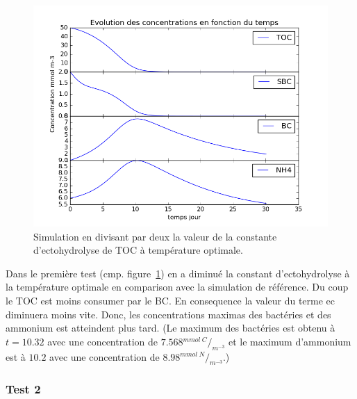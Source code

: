 \begin{figure}[h!]
  \includegraphics[width=\textwidth]{partie1/Test1.png}
  \caption{Simulation en divisant par deux la valeur de la constante d'ectohydrolyse de TOC \`a temp\'erature optimale.
  }
  \label{fig:partie1test1}
\end{figure}
\par{
Dans le première test (cmp. figure~\ref{fig:partie1test1}) en a diminué la constant d'ectohydrolyse à la température optimale en comparison avec
la simulation de référence. Du coup le TOC est moins consumer par le BC. En consequence la valeur du terme
ec diminuera moins vite. Donc, les concentrations maximas des bactéries et des ammonium est atteindent
plus tard. (Le maximum des bactéries est obtenu à $t=10.32$ avec une concentration de
$7.568 {^{mmol~C}/_{m^{-3}}}$ et le maximum d'ammonium est à $10.2$ avec une concentration de
$8.98 {^{mmol~N}/_{m^{-3}}}$.)
}

\FloatBarrier
\newpage
\subsubsection{Test 2}

